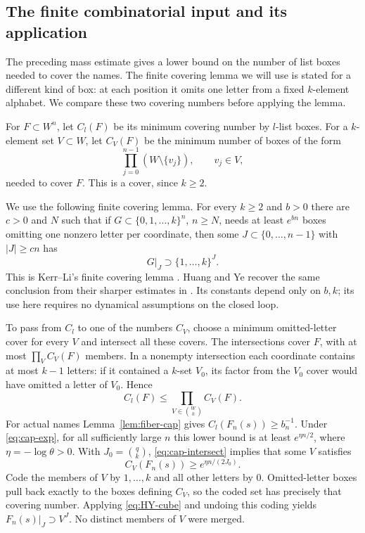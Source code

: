 \documentclass[11pt,reqno]{amsart}
\numberwithin{equation}{section}
\theoremstyle{definition}
\theoremstyle{definition}
\begin{document}
\subsection{The finite combinatorial input and its application}
The preceding mass estimate gives a lower bound on the number of
list boxes needed to cover the names. The finite covering lemma we
will use is stated for a different kind of box: at each position it
omits one letter from a fixed $k$-element alphabet. We compare these
two covering numbers before applying the lemma.

For $F\subset W^n$, let $C_l(F)$ be its minimum covering number by
$l$-list boxes. For a $k$-element set $V\subset W$, let $C_V(F)$
be the minimum number of boxes of the form
\[
 \prod_{j=0}^{n-1}(W\setminus\{v_j\}),\qquad v_j\in V,
\]
needed to cover $F$. This is a cover, since $k\ge2$.

We use the following finite covering lemma. For every
$k\ge2$ and $b>0$ there are $c>0$ and $N$ such that if
$G\subset\{0,1,\ldots,k\}^n$, $n\ge N$, needs at least
$e^{bn}$ boxes omitting one nonzero letter per coordinate, then some
$J\subset\{0,\ldots,n-1\}$ with $|J|\ge cn$ has
\begin{equation}\label{eq:HY-cube}
 G|_J\supset\{1,\ldots,k\}^{J}.
\end{equation}
This is Kerr--Li's finite covering lemma
\cite[Lemma~3.3]{KL2007}. Huang and Ye recover the same conclusion
from their sharper estimates in \cite[Lemma~4.1 and Remark~4.2,
pp.~1701--1705]{HuangYe2009}. Its constants depend only on $b,k$;
its use here requires no dynamical assumptions on the closed loop.

To pass from $C_l$ to one of the numbers $C_V$, choose a minimum
omitted-letter cover for every $V$ and intersect all these covers. The intersections cover $F$, with at most
$\prod_V C_V(F)$ members. In a nonempty intersection each coordinate
contains at most $k-1$ letters: if it contained a $k$-set $V_0$, its
factor from the $V_0$ cover would have omitted a letter of $V_0$.
Hence
\begin{equation}\label{eq:cap-intersect}
 C_l(F)\le\prod_{V\in\binom Wk}C_V(F).
\end{equation}
For actual names Lemma~\ref{lem:fiber-cap} gives
$C_l(F_n(s))\ge b_n^{-1}$. Under \eqref{eq:cap-exp}, for all
sufficiently large $n$ this lower bound is at least
$e^{\eta n/2}$, where $\eta=-\log\theta>0$. With
$J_0=\binom qk$, \eqref{eq:cap-intersect} implies that some $V$
satisfies
\[
 C_V(F_n(s))\ge e^{\eta n/(2J_0)}.
\]
Code the members of $V$ by $1,\ldots,k$ and all other letters by
$0$. Omitted-letter boxes pull back exactly to the boxes defining
$C_V$, so the coded set has precisely that covering number. Applying
\eqref{eq:HY-cube} and undoing this coding yields
$F_n(s)|_J\supset V^J$. No distinct members of $V$ were merged.
\end{document}
